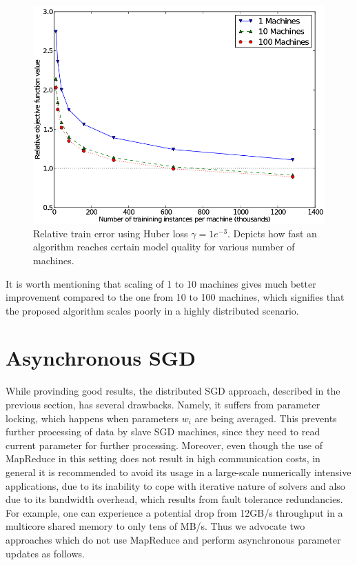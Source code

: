 \begin{figure}[h]
	\begin{center}
		\includegraphics[scale=0.3]{img/parallel-sgd-experiment2.png}
		\caption{Relative train error using Huber loss $\gamma= 1e^{-3}$. Depicts how fast an algorithm reaches certain model quality for various number of machines.}\label{3}
	\end{center}
\end{figure}

It is worth mentioning that scaling of 1 to 10 machines gives much better improvement compared to the one from 10 to 100 machines, which signifies that the proposed algorithm scales poorly in a highly distributed scenario.

\section{Asynchronous SGD}
While provinding good results, the distributed SGD approach, described in the previous section, has several drawbacks. Namely, it suffers from parameter locking, which happens when parameters $w_i$ are being averaged. This prevents further processing of data by slave SGD machines, since they need to read current parameter for further processing. Moreover, even though the use of MapReduce in this setting does not result in high communication costs, in general it is recommended to avoid its usage in a large-scale numerically intensive applications, due to its inability to cope with iterative nature of solvers and also due to its bandwidth overhead, which results from fault tolerance redundancies. For example, one can experience a potential drop from 12GB/s throughput in a multicore shared memory to only tens of MB/s. Thus we advocate two approaches which do not use MapReduce and perform asynchronous parameter updates as follows.

